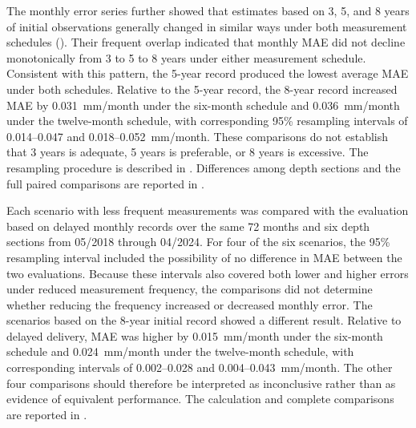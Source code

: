 The monthly error series further showed that estimates based on 3, 5, and 8 years of initial observations generally changed in similar ways under both measurement schedules (). Their frequent overlap indicated that monthly MAE did not decline monotonically from 3 to 5 to 8 years under either measurement schedule. Consistent with this pattern, the 5-year record produced the lowest average MAE under both schedules. Relative to the 5-year record, the 8-year record increased MAE by 0.031~mm/month under the six-month schedule and 0.036~mm/month under the twelve-month schedule, with corresponding 95\% resampling intervals of 0.014--0.047 and 0.018--0.052~mm/month. These comparisons do not establish that 3 years is adequate, 5 years is preferable, or 8 years is excessive. The resampling procedure is described in . Differences among depth sections and the full paired comparisons are reported in . %

Each scenario with less frequent measurements was compared with the evaluation based on delayed monthly records over the same 72 months and six depth sections from 05/2018 through 04/2024. For four of the six scenarios, the 95\% resampling interval included the possibility of no difference in MAE between the two evaluations. Because these intervals also covered both lower and higher errors under reduced measurement frequency, the comparisons did not determine whether reducing the frequency increased or decreased monthly error. The scenarios based on the 8-year initial record showed a different result. Relative to delayed delivery, MAE was higher by 0.015~mm/month under the six-month schedule and 0.024~mm/month under the twelve-month schedule, with corresponding intervals of 0.002--0.028 and 0.004--0.043~mm/month. The other four comparisons should therefore be interpreted as inconclusive rather than as evidence of equivalent performance. The calculation and complete comparisons are reported in .

